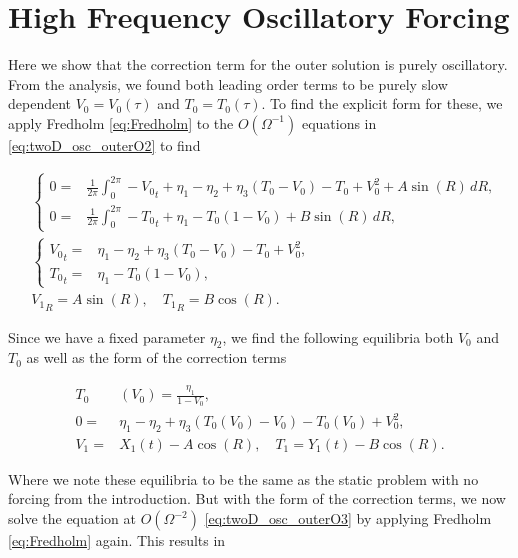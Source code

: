 \section*{High Frequency Oscillatory Forcing}

Here we show that the correction term for the outer solution is purely oscillatory. From the analysis, we found both leading order terms to be purely slow dependent $V_0=V_0(\tau)$ and $T_0=T_0(\tau)$. To find the explicit form for these, we apply Fredholm \eqref{eq:Fredholm} to the $O(\Omega^{-1})$ equations in \eqref{eq:twoD_osc_outerO2} to find

\begin{equation}\label{eq:twoD_app_osc1}
\begin{aligned}
&\begin{cases}
	0 = & \frac{1}{2\pi}\int_0^{2\pi}-{V_0}_t+\eta_1-\eta_2+\eta_3(T_0-V_0)-T_0+V_0^2+A\sin(R)\,dR,\\
	 0 =& \frac{1}{2\pi}\int_0^{2\pi}-{T_0}_t+ \eta_1-T_0(1-V_0)+B\sin(R)\,dR,
\end{cases}\\
&\begin{cases}
	{V_0}_t = & \eta_1-\eta_2+\eta_3(T_0-V_0)-T_0+V_0^2,\\
	 {T_0}_t =&  \eta_1-T_0(1-V_0),
\end{cases}\\
& {V_1}_R = A\sin(R),\quad {T_1}_R = B\cos(R).
\end{aligned}
\end{equation}

Since we have a fixed parameter $\eta_2$, we find the following equilibria both $V_0$ and $T_0$ as well as the form of the correction terms

\begin{equation*}
\begin{aligned}
T_0&(V_0) = \frac{\eta_1}{1-V_0},\\
0= & \eta_1-\eta_2 +\eta_3(T_0(V_0)-V_0)-T_0(V_0)+V_0^2,\\
V_1 =& X_1(t)-A\cos(R),  \quad T_1 = Y_1(t)-B\cos(R).
\end{aligned}
\end{equation*}

Where we note these equilibria to be the same as the static problem with no forcing from the introduction. But with the form of the correction terms, we now solve the equation at $O(\Omega^{-2})$ \eqref{eq:twoD_osc_outerO3} by applying Fredholm \eqref{eq:Fredholm} again. This results in

